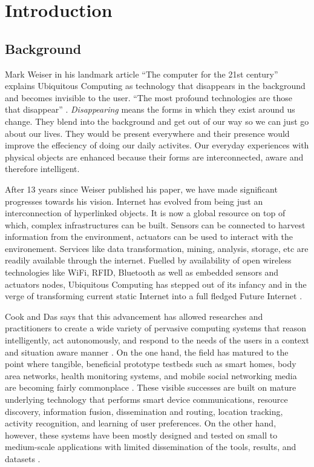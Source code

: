 \chapter{Introduction}

\section{Background}

Mark Weiser in his landmark article ``The computer for the 21st century'' \cite{Weiser1991} explains Ubiquitous Computing as technology that disappears in the background and becomes invisible to the user. ``The most profound technologies are those that disappear'' \cite{Weiser1991}. \emph{Disappearing} means the forms in which they exist around us change. They blend into the background and get out of our way so we can just go about our lives. They would be present everywhere and their presence would improve the effeciency of doing our daily activites. Our everyday experiences with physical objects are enhanced because their forms are interconnected, aware and therefore intelligent.

After 13 years since Weiser published his paper, we have made significant progresses towards his vision. Internet has evolved from being just an interconnection of hyperlinked objects. It is now a global resource on top of which, complex infrastructures can be built. Sensors can be connected to harvest information from the environment, actuators can be used to interact with the environement. Services like data transformation, mining, analysis, storage, etc are readily available through the internet. Fuelled by availability of open wireless technologies like WiFi, RFID, Bluetooth as well as embedded sensors and actuators nodes, Ubiquitous Computing has stepped out of its infancy and in the verge of transforming current static Internet into a full fledged Future Internet \cite{Gubbi2013}.

Cook and Das says that this advancement has allowed researches and practitioners to create a wide variety of pervasive computing systems that reason intelligently, act autonomously, and respond to the needs of the users in a context and situation aware manner \cite{Cook2012}. On the one hand, the field has matured to the point where tangible, beneficial prototype testbeds such as smart homes, body area networks, health monitoring systems, and mobile social networking media are becoming fairly commonplace \cite{Cook2012}. These visible successes are built on mature underlying technology that performs smart device communications, resource discovery, information fusion, dissemination and routing, location tracking, activity recognition, and learning of user preferences. On the other hand, however, these systems have been mostly designed and tested on small to medium-scale applications with limited dissemination of the tools, results, and datasets \cite{Cook2012}.

